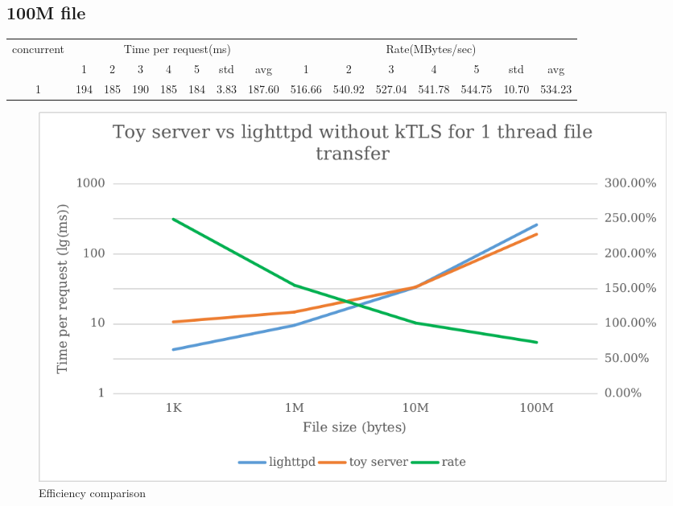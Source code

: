 \documentclass{article}
\begin{document}
\subsection*{100M file}
\begin{table}[H]
    \begin{tabular}{|c|c|c|c|c|c|c|c|c|c|c|c|c|c|c|}
        \hline
        \multirow{2}{*}{concurrent} & \multicolumn{7}{c|}{Time per request(ms)} & \multicolumn{7}{c|}{Rate(MBytes/sec)}                                                                                                 \\ \cline{2-15}
                                    & 1                                         & 2                                     & 3   & 4   & 5   & std  & avg    & 1      & 2      & 3      & 4      & 5      & std   & avg    \\ \hline
        1                           & 194                                       & 185                                   & 190 & 185 & 184 & 3.83 & 187.60 & 516.66 & 540.92 & 527.04 & 541.78 & 544.75 & 10.70 & 534.23 \\ \hline
    \end{tabular}
\end{table}
\begin{figure}[H]
    \centering
    \includegraphics[scale=0.6]{pic/p2.png}
    \caption{Efficiency comparison}

\end{figure}
\end{document}
